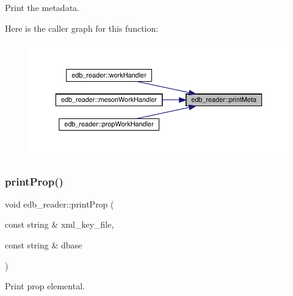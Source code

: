Print the metadata. 

Here is the caller graph for this function\+:
\nopagebreak
\begin{figure}[H]
\begin{center}
\leavevmode
\includegraphics[width=350pt]{d8/d4f/namespaceedb__reader_a9caf0c894a49fc4a9829aead7ec614fd_icgraph}
\end{center}
\end{figure}
\mbox{\label{namespaceedb__reader_a35b2acb7ef05b07177eb13058c1f4768}} 
\subsubsection{\texorpdfstring{printProp()}{printProp()}}
{\footnotesize\ttfamily void edb\+\_\+reader\+::print\+Prop (\begin{DoxyParamCaption}\item[{const string \&}]{xml\+\_\+key\+\_\+file,  }\item[{const string \&}]{dbase }\end{DoxyParamCaption})}



Print prop elemental. 

